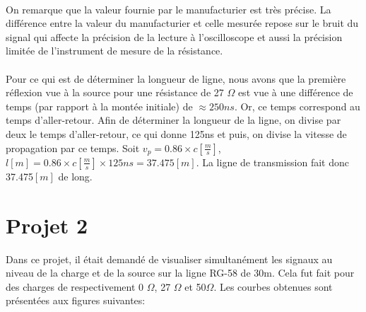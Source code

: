\paragraph{}On remarque que la valeur fournie par le manufacturier est très précise. La différence entre la valeur du manufacturier et celle mesurée repose sur le bruit du signal qui affecte la précision de la lecture à l'oscilloscope et aussi la précision limitée de l'instrument de mesure de la résistance. 

\paragraph{}Pour ce qui est de déterminer la longueur de ligne, nous avons que la première réflexion vue à la source pour une résistance de 27 $\Omega$ est vue à une différence de temps (par rapport à la montée initiale) de $\approx 250ns$. Or, ce temps correspond au temps d'aller-retour. Afin de déterminer la longueur de la ligne, on divise par deux le temps d'aller-retour, ce qui donne 125ns et puis, on divise la vitesse de propagation par ce temps. Soit $v_p = 0.86 \times c \left[\frac{m}{s}\right]$, $l \left[m\right] = 0.86\times c \left[\frac{m}{s}\right] \times 125 ns = 37.475 \left[m\right]$. La ligne de transmission fait donc 37.475$\left[m\right]$ de long.

\section{Projet 2}

Dans ce projet, il était demandé de visualiser simultanément les signaux au niveau de la charge et de la source sur la ligne RG-58 de 30m. Cela fut fait pour des charges de respectivement 0 $\Omega$, 27 $\Omega$ et 50$\Omega$. Les courbes obtenues sont présentées aux figures suivantes:
